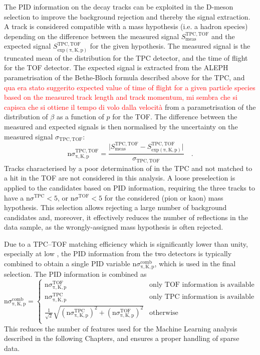 The PID information on the decay tracks can be exploited in the D-meson selection to improve the background rejection and thereby the signal extraction. A track is considered compatible with a mass hypothesis (i.e. a hadron species) depending on the difference between the measured signal $S_\mathrm{meas}^\mathrm{TPC,TOF}$ and the expected signal $S_\mathrm{exp (\pi, K, p)}^\mathrm{TPC,TOF}$ for the given hypothesis. The measured signal is the truncated mean of the \dedx distribution for the TPC detector, and the time of flight for the TOF detector. The expected signal is extracted from the ALEPH parametrisation of the Bethe-Bloch formula described above for the TPC, and \textcolor{red}{qua era stato suggerito expected value of time of flight for a given particle species based on the measured track length and track momentum, mi sembra che si capisca che si ottiene il tempo di volo dalla velocità} from a parametrisation of the distribution of $\beta$ as a function of $p$ for the TOF. The difference between the measured and expected signals is then normalised by the uncertainty on the measured signal $\sigma_\mathrm{TPC, TOF}$:
\begin{equation*}
    \mathrm{n}\sigma_\mathrm{\pi, K, p}^\mathrm{TPC, TOF} = \frac{\lvert S_\mathrm{meas}^\mathrm{TPC, TOF} - S_\mathrm{exp (\pi, K, p)}^\mathrm{TPC, TOF}\rvert}{\sigma_\mathrm{TPC, TOF}}\quad .
\end{equation*}
Tracks characterised by a poor determination of \dedx in the TPC and not matched to a hit in the TOF are not considered in this analysis. A loose preselection is applied to the candidates based on PID information, requiring the three tracks to have a $\mathrm{n}\sigma^\mathrm{TPC} < 5$, or $\mathrm{n}\sigma^\mathrm{TOF} < 5$ for the considered (pion or kaon) mass hypothesis. This selection allows rejecting a large number of background candidates and, moreover, it effectively reduces the number of reflections in the data sample, as the wrongly-assigned mass hypothesis is often rejected.

Due to a TPC--TOF matching efficiency which is significantly lower than unity, especially at low \pt, the PID information from the two detectors is typically combined to obtain a single PID variable $\mathrm{n}\sigma^\mathrm{comb}_\mathrm{\pi, K, p}$, which is used in the final selection. The PID information is combined as
\begin{equation*}
    \mathrm{n}\sigma^\mathrm{comb}_\mathrm{\pi, K, p} = 
    \begin{cases}
        \mathrm{n}\sigma^\mathrm{TOF}_\mathrm{\pi, K, p} & \text{only TOF information is available}\\
        \mathrm{n}\sigma^\mathrm{TPC}_\mathrm{\pi, K, p} & \text{only TPC information is available}\\
        \frac{1}{\sqrt{2}}\sqrt{(\mathrm{n}\sigma^\mathrm{TPC}_\mathrm{\pi, K, p})^2 + (\mathrm{n}\sigma^\mathrm{TOF}_\mathrm{\pi, K, p})^2} & \text{otherwise}\\
    \end{cases}
\end{equation*}
This reduces the number of features used for the Machine Learning analysis described in the following Chapters, and ensures a proper handling of sparse data.


